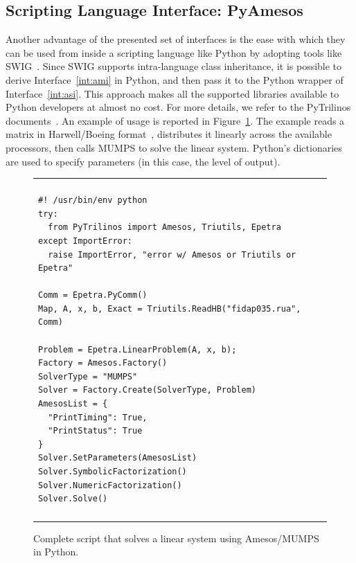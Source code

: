 \documentclass[acmtocl]{acmtrans2m}
\newcommand{\amesos}{{\sc Amesos}}
\begin{document}
\subsection{Scripting Language Interface: PyAmesos}
\label{sec:pyamesos}

Another advantage of the presented set of interfaces is the ease with which
they can be used from inside a scripting language like Python by adopting tools
  like SWIG~\cite{swig}. Since SWIG supports intra-language class inheritance,
  it is possible to derive Interface~\ref{int:ami} in Python, and then pass it
  to the Python wrapper of Interface~\ref{int:asi}. This approach makes all the
  supported libraries available to Python developers at almost no cost. For
  more details, we refer to the PyTrilinos
  documents~\cite{sala05pytrilinos,pytrilinos-la-guide}. 
An example of usage is reported in Figure~\ref{fig:pyamesos}. The example
reads a matrix in Harwell/Boeing format~\cite{duff89sparse}, 
      distributes it linearly across the
available processors, then calls MUMPS to solve the linear system. Python's
dictionaries are used to specify parameters (in this case, the level of
                                             output). 

\begin{figure}
\begin{center}
\begin{tabular}{| p{12cm} |}
\hline
\\
\footnotesize
\begin{minipage}{11.5cm}
\begin{verbatim}
#! /usr/bin/env python
try:
  from PyTrilinos import Amesos, Triutils, Epetra
except ImportError:
  raise ImportError, "error w/ Amesos or Triutils or Epetra"

Comm = Epetra.PyComm()
Map, A, x, b, Exact = Triutils.ReadHB("fidap035.rua", Comm)

Problem = Epetra.LinearProblem(A, x, b);
Factory = Amesos.Factory()
SolverType = "MUMPS"
Solver = Factory.Create(SolverType, Problem)
AmesosList = {
  "PrintTiming": True,
  "PrintStatus": True
}
Solver.SetParameters(AmesosList)
Solver.SymbolicFactorization()
Solver.NumericFactorization()
Solver.Solve()
\end{verbatim}
\end{minipage}
\\
\\
\hline
\end{tabular}
\caption{Complete script that solves a linear system using \amesos/MUMPS in
  Python.}
\label{fig:pyamesos}
\end{center}
\end{figure}
\end{document}
